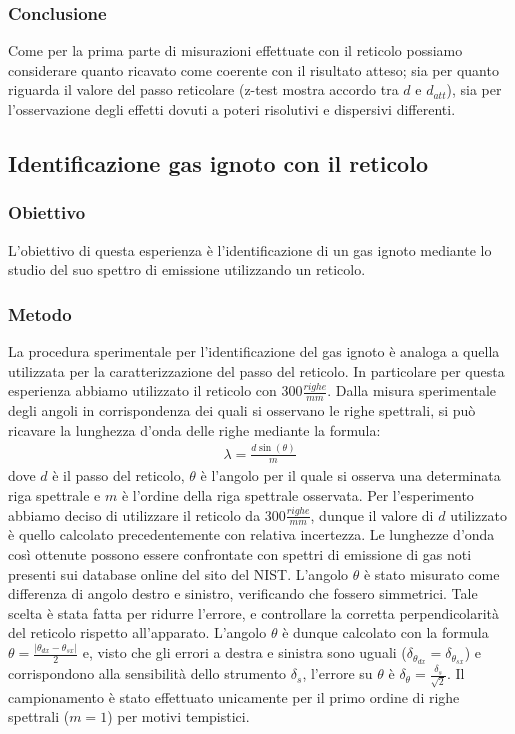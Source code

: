 \documentclass[a4paper]{article}
\begin{document}
\subsubsection{Conclusione}
Come per la prima parte di misurazioni effettuate con il reticolo possiamo considerare quanto ricavato come coerente con il risultato atteso; sia per quanto riguarda il valore del passo reticolare (z-test mostra accordo tra $d$ e $d_{att}$), sia per l'osservazione degli effetti dovuti a poteri risolutivi e dispersivi differenti.




\subsection{Identificazione gas ignoto con il reticolo}
\subsubsection{Obiettivo}
L'obiettivo di questa esperienza è l'identificazione di un gas ignoto mediante lo studio del suo spettro di emissione utilizzando un reticolo.

\subsubsection{Metodo}
La procedura sperimentale per l'identificazione del gas ignoto è analoga a quella utilizzata per la caratterizzazione del passo del reticolo. In particolare per questa esperienza abbiamo utilizzato il reticolo con $300 \frac{righe}{mm}$. Dalla misura sperimentale degli angoli in corrispondenza dei quali si osservano le righe spettrali, si può ricavare la lunghezza d'onda delle righe mediante la formula:
\begin{align}
    \lambda=\frac{d\sin(\theta)}{m}
\label{eq:lambda_gas_ignoto_reticolo}
\end{align}
dove $d$ è il passo del reticolo, $\theta$ è l'angolo per il quale si osserva una determinata riga spettrale e $m$ è l'ordine della riga spettrale osservata. Per l'esperimento abbiamo deciso di utilizzare il reticolo da $300\frac{righe}{mm}$, dunque il valore di $d$ utilizzato è quello calcolato precedentemente con relativa incertezza.
Le lunghezze d'onda così ottenute possono essere confrontate con spettri di emissione di gas noti presenti sui database online del sito del NIST.
L'angolo $\theta$ è stato misurato come differenza di angolo destro e sinistro, verificando che fossero simmetrici. Tale scelta è stata fatta per ridurre l'errore, e controllare la corretta perpendicolarità del reticolo rispetto all'apparato. L'angolo $\theta$ è dunque calcolato con la formula $\theta=\frac{|\theta_{dx}-\theta_{sx}|}{2}$ e, visto che gli errori a destra e sinistra sono uguali ($\delta_{\theta_{dx}}=\delta_{\theta_{sx}}$) e corrispondono alla sensibilità dello strumento $\delta_s$, l'errore su $\theta$ è $\delta_\theta=\frac{\delta_s}{\sqrt{2}}$. Il campionamento è stato effettuato unicamente per il primo ordine di righe spettrali ($m=1$) per motivi tempistici.
\end{document}
